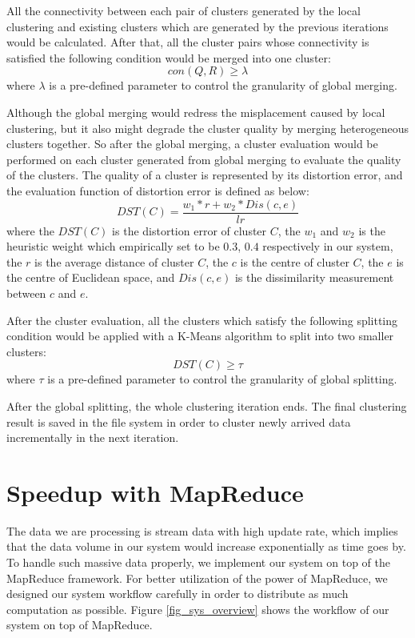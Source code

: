 \documentclass[conference]{IEEEtran}
\begin{document}
All the connectivity between each pair of clusters generated by the local clustering and existing clusters which are generated by the previous iterations would be calculated. After that, all the cluster pairs whose connectivity is satisfied the following condition would be merged into one cluster:
\begin{equation}\label{eq_mergingCondition}
con(Q, R) \geq \lambda
\end{equation}
where $ \lambda $ is a pre-defined parameter to control the granularity of global merging.


Although the global merging would redress the misplacement caused by local clustering, but it also might degrade the cluster quality by merging heterogeneous clusters together. So after the global merging, a cluster evaluation would be performed on each cluster generated from global merging to evaluate the quality of the clusters. The quality of a cluster is represented by its distortion error, and the evaluation function of distortion error is defined as below:
\begin{equation}\label{eq_quality}
DST(C) = \frac{w_1 * r + w_2 * Dis(c, e )}{lr}
\end{equation}
where the $ DST(C) $ is the distortion error of cluster $ C $, the $ w_1 $ and $ w_2 $ is the heuristic weight which empirically set to be $ 0.3 $, $ 0.4 $ respectively in our system, the $ r $ is the average distance of cluster $ C $, the $ c $ is the centre of cluster $ C $, the $ e $ is the centre of Euclidean space, and $ Dis(c, e) $ is the dissimilarity measurement between $ c $ and $ e $. 


After the cluster evaluation, all the clusters which satisfy the following splitting condition would be applied with a K-Means algorithm to split into two smaller clusters:
\begin{equation}\label{eq_splittingCondition}
DST(C) \geq \tau
\end{equation} 
where $ \tau $ is a pre-defined parameter to control the granularity of global splitting. 


After the global splitting, the whole clustering iteration ends. The final clustering result is saved in the file system in order to cluster newly arrived data incrementally in the next iteration.


\section{Speedup with MapReduce}
The data we are processing is stream data with high update rate, which implies that the data volume in our system would increase exponentially as time goes by. To handle such massive data properly, we implement our system on top of the MapReduce framework. For better utilization of the power of MapReduce, we designed our system workflow carefully in order to distribute as much computation as possible. Figure \ref{fig_sys_overview} shows the workflow of our system on top of MapReduce.
\end{document}
